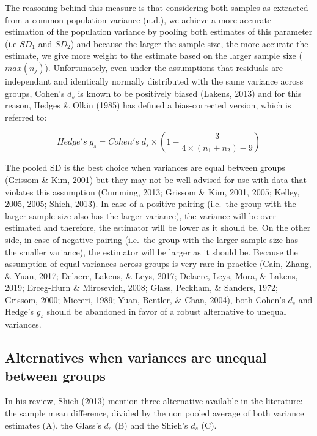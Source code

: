 \documentclass[
  man]{apa6}
\begin{document}
The reasoning behind this measure is that considering both samples as extracted from a common population variance (n.d.), we achieve a more accurate estimation of the population variance by pooling both estimates of this parameter (i.e \(SD_1\) and \(SD_2\)) and because the larger the sample size, the more accurate the estimate, we give more weight to the estimate based on the larger sample size (\(max(n_j)\)). Unfortunately, even under the assumptions that residuals are independant and identically normally distributed with the same variance across groups, Cohen's \(d_s\) is known to be positively biased (Lakens, 2013) and for this reason, Hedges \& Olkin (1985) has defined a bias-corrected version, which is referred to:

\begin{equation} 
Hedge's \; g_s = Cohen's \; d_s \times (1-\frac{3}{4 \times (n_1+n_2)-9}) 
\label{eq:Hedgesgs}
\end{equation}

The pooled SD is the best choice when variances are equal between groups (Grissom \& Kim, 2001) but they may not be well advised for use with data that violates this assumption (Cumming, 2013; Grissom \& Kim, 2001, 2005; Kelley, 2005, 2005; Shieh, 2013). In case of a positive pairing (i.e.~the group with the larger sample size also has the larger variance), the variance will be over-estimated and therefore, the estimator will be lower as it should be. On the other side, in case of negative pairing (i.e.~the group with the larger sample size has the smaller variance), the estimator will be larger as it should be. Because the assumption of equal variances across groups is very rare in practice (Cain, Zhang, \& Yuan, 2017; Delacre, Lakens, \& Leys, 2017; Delacre, Leys, Mora, \& Lakens, 2019; Erceg-Hurn \& Mirosevich, 2008; Glass, Peckham, \& Sanders, 1972; Grissom, 2000; Micceri, 1989; Yuan, Bentler, \& Chan, 2004), both Cohen's \(d_s\) and Hedge's \(g_s\) should be abandoned in favor of a robust alternative to unequal variances.

\hypertarget{alternatives-when-variances-are-unequal-between-groups}{%
\subsection{Alternatives when variances are unequal between groups}\label{alternatives-when-variances-are-unequal-between-groups}}

In his review, Shieh (2013) mention three alternative available in the literature: the sample mean difference, divided by the non pooled average of both variance estimates (A), the Glass's \(d_s\) (B) and the Shieh's \(d_s\) (C).
\end{document}
